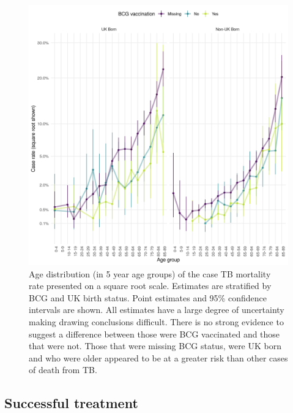 \documentclass[11pt,twoside]{bristolthesis}
\begin{document}
  \begin{figure}
  
  {\centering \includegraphics[width=0.8\linewidth,]{chapters/tb-epi-england/figures/plot-tb-mort-age-dist} 
  
  }
  
  \caption[Age distribution (in 5 year age groups) of the case TB mortality rate presented on a square root scale.]{Age distribution (in 5 year age groups) of the case TB mortality rate presented on a square root scale. Estimates are stratified by BCG and UK birth status. Point estimates and 95\%  confidence intervals are shown. All estimates have a large degree of uncertainty making drawing conclusions difficult. There is no strong evidence to suggest a difference between those were BCG vaccinated and those that were not. Those that were missing BCG status, were UK born and who were older appeared to be at a greater risk than other cases of death from TB.}\label{fig:plot-tb-mort-age-dist}
  \end{figure}
  \hypertarget{successful-treatment}{%
  \subsection{Successful treatment}\label{successful-treatment}}
  
\end{document}
